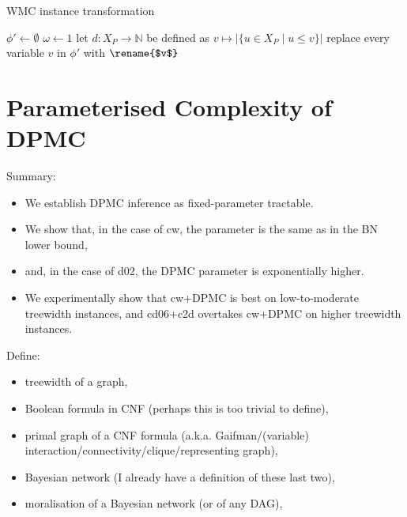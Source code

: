 \documentclass{article}
\theoremstyle{definition}
\theoremstyle{remark}
\begin{document}
\begin{algorithm}
  \caption{WMC instance transformation}
  $\phi' \gets \emptyset$\;
  $\omega \gets 1$\;
  let $d\colon X_P \to \mathbb{N}$ be defined as $v \mapsto |\{ u \in X_P \mid u
  \le v \}|$\;
  replace every variable $v$ in $\phi'$ with $\rename{$v$}$\;
  \;
\end{algorithm}

\section{Parameterised Complexity of DPMC}


Summary:
\begin{itemize}
\item We establish DPMC inference as fixed-parameter tractable.
\item We show that, in the case of cw, the parameter is the same as in the BN lower bound,
\item and, in the case of d02, the DPMC parameter is exponentially higher.
\item We experimentally show that cw+DPMC is best on low-to-moderate treewidth
  instances, and cd06+c2d overtakes cw+DPMC on higher treewidth instances.
\end{itemize}

Define:
\begin{itemize}
\item treewidth of a graph,
\item Boolean formula in CNF (perhaps this is too trivial to define),
\item primal graph of a CNF formula (a.k.a.
  Gaifman/(variable) interaction/connectivity/clique/representing graph),
\item Bayesian network (I already have a definition of these last two),
\item moralisation of a Bayesian network (or of any DAG),
\end{itemize}
\end{document}

